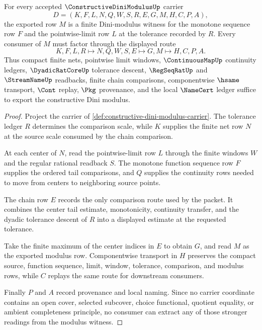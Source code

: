 \begin{theorem}
\label{thm:constructive-dini-modulus-finite-chain}
For every accepted $\ConstructiveDiniModulusUp$ carrier
$$
D=(K,F,L,N,Q,W,S,R,E,G,M,H,C,P,A),
$$
the exported row $M$ is a finite Dini-modulus witness for the monotone sequence row $F$ and the pointwise-limit row $L$ at the tolerance recorded by $R$. Every consumer of $M$ must factor through the displayed route
$$
K,F,L,R \longmapsto N,Q,W,S,E \longmapsto G,M \longmapsto H,C,P,A.
$$
Thus compact finite nets, pointwise limit windows, $\ContinuousMapUp$ continuity ledgers, $\DyadicRatCoreUp$ tolerance descent, $\RegSeqRatUp$ and $\StreamNameUp$ readbacks, finite chain comparisons, componentwise $\hsame$ transport, $\Cont$ replay, $\Pkg$ provenance, and the local $\NameCert$ ledger suffice to export the constructive Dini modulus.
\end{theorem}
\begin{proof}
Project the carrier of \autoref{def:constructive-dini-modulus-carrier}. The tolerance ledger $R$ determines the comparison scale, while $K$ supplies the finite net row $N$ at the source scale consumed by the chain comparison.

At each center of $N$, read the pointwise-limit row $L$ through the finite windows $W$ and the regular rational readback $S$. The monotone function sequence row $F$ supplies the ordered tail comparisons, and $Q$ supplies the continuity rows needed to move from centers to neighboring source points.

The chain row $E$ records the only comparison route used by the packet. It combines the center tail estimate, monotonicity, continuity transfer, and the dyadic tolerance descent of $R$ into a displayed estimate at the requested tolerance.

Take the finite maximum of the center indices in $E$ to obtain $G$, and read $M$ as the exported modulus row. Componentwise transport in $H$ preserves the compact source, function sequence, limit, window, tolerance, comparison, and modulus rows, while $C$ replays the same route for downstream consumers.

Finally $P$ and $A$ record provenance and local naming. Since no carrier coordinate contains an open cover, selected subcover, choice functional, quotient equality, or ambient completeness principle, no consumer can extract any of those stronger readings from the modulus witness.
\end{proof}

